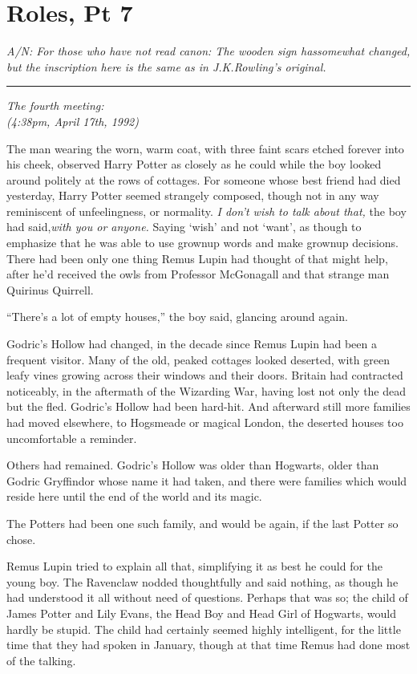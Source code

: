 \chapter{Roles, Pt 7}

\emph{A/N: For those who have not read canon: The wooden sign hassomewhat changed, but the inscription here is the same as in J.K.Rowling's original.}

\begin{center}\rule{3in}{0.4pt}\end{center}

\emph{The fourth meeting:\\ (4:38pm, April 17th, 1992)}

The man wearing the worn, warm coat, with three faint scars etched forever into his cheek, observed Harry Potter as closely as he could while the boy looked around politely at the rows of cottages. For someone whose best friend had died yesterday, Harry Potter seemed strangely composed, though not in any way reminiscent of unfeelingness, or normality. \emph{I don't wish to talk about that,} the boy had said,\emph{with you or anyone.} Saying `wish' and not `want', as though to emphasize that he was able to use grownup words and make grownup decisions. There had been only one thing Remus Lupin had thought of that might help, after he'd received the owls from Professor McGonagall and that strange man Quirinus Quirrell.

``There's a lot of empty houses,'' the boy said, glancing around again.

Godric's Hollow had changed, in the decade since Remus Lupin had been a frequent visitor. Many of the old, peaked cottages looked deserted, with green leafy vines growing across their windows and their doors. Britain had contracted noticeably, in the aftermath of the Wizarding War, having lost not only the dead but the fled. Godric's Hollow had been hard-hit. And afterward still more families had moved elsewhere, to Hogsmeade or magical London, the deserted houses too uncomfortable a reminder.

Others had remained. Godric's Hollow was older than Hogwarts, older than Godric Gryffindor whose name it had taken, and there were families which would reside here until the end of the world and its magic.

The Potters had been one such family, and would be again, if the last Potter so chose.

Remus Lupin tried to explain all that, simplifying it as best he could for the young boy. The Ravenclaw nodded thoughtfully and said nothing, as though he had understood it all without need of questions. Perhaps that was so; the child of James Potter and Lily Evans, the Head Boy and Head Girl of Hogwarts, would hardly be stupid. The child had certainly seemed highly intelligent, for the little time that they had spoken in January, though at that time Remus had done most of the talking.

